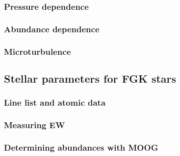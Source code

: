 \subsubsection{Pressure dependence}

\subsubsection{Abundance dependence}

\subsubsection{Microturbulence}


\subsection{Stellar parameters for FGK stars}

\subsubsection{Line list and atomic data}

\subsubsection{Measuring EW}

\subsubsection{Determining abundances with MOOG}
